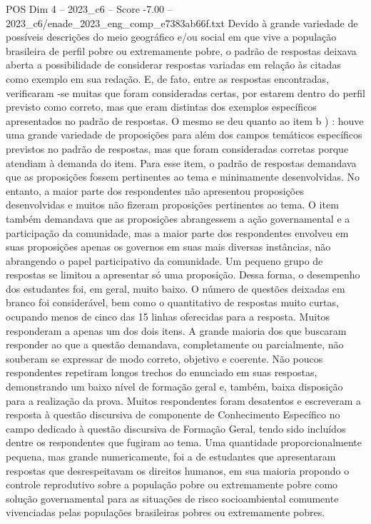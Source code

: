 \begin{textsample}{POS Dim 4 – 2023\_c6 – Score -7.00 – 2023\_c6/enade\_2023\_eng\_comp\_e7383ab66f.txt}
Devido à grande variedade de possíveis descrições do meio geográfico e/ou social em que vive a população brasileira de perfil pobre ou extremamente pobre, o padrão de respostas deixava aberta a possibilidade de considerar respostas variadas em relação às citadas como exemplo em sua redação.
E, de fato, entre as respostas encontradas, verificaram -se muitas que foram consideradas certas, por estarem dentro do perfil previsto como correto, mas que eram distintas dos exemplos específicos apresentados no padrão de respostas.
O mesmo se deu quanto ao item b ) : houve uma grande variedade de proposições para além dos campos temáticos específicos previstos no padrão de respostas, mas que foram consideradas corretas porque atendiam à demanda do item.
Para esse item, o padrão de respostas demandava que as proposições fossem pertinentes ao tema e minimamente desenvolvidas.
No entanto, a maior parte dos respondentes não apresentou proposições desenvolvidas e muitos não fizeram proposições pertinentes ao tema.
O item também demandava que as proposições abrangessem a ação governamental e a participação da comunidade, mas a maior parte dos respondentes envolveu em suas proposições apenas os governos em suas mais diversas instâncias, não abrangendo o papel participativo da comunidade.
Um pequeno grupo de respostas se limitou a apresentar só uma proposição.
Dessa forma, o desempenho dos estudantes foi, em geral, muito baixo.
O número de questões deixadas em branco foi considerável, bem como o quantitativo de respostas muito curtas, ocupando menos de cinco das 15 linhas oferecidas para a resposta.
Muitos responderam a apenas um dos dois itens.
A grande maioria dos que buscaram responder ao que a questão demandava, completamente ou parcialmente, não souberam se expressar de modo correto, objetivo e coerente.
Não poucos respondentes repetiram longos trechos do enunciado em suas respostas, demonstrando um baixo nível de formação geral e, também, baixa disposição para a realização da prova.
Muitos respondentes foram desatentos e escreveram a resposta à questão discursiva de componente de Conhecimento Específico no campo dedicado à questão discursiva de Formação Geral, tendo sido incluídos dentre os respondentes que fugiram ao tema.
Uma quantidade proporcionalmente pequena, mas grande numericamente, foi a de estudantes que apresentaram respostas que desrespeitavam os direitos humanos, em sua maioria propondo o controle reprodutivo sobre a população pobre ou extremamente pobre como solução governamental para as situações de risco socioambiental comumente vivenciadas pelas populações brasileiras pobres ou extremamente pobres.

\end{textsample}
